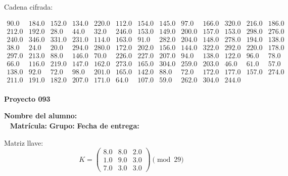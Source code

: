 \documentclass[12pt]{article}
\begin{document}
Cadena cifrada:
\begin{center}
$\begin{array}{lllllllllllll}
90.0 & 184.0 & 152.0 & 134.0 & 220.0 & 112.0 & 154.0 & 145.0 & 97.0 & 166.0 & 320.0 & 216.0 & 186.0\\
212.0 & 192.0 & 28.0 & 44.0 & 32.0 & 246.0 & 153.0 & 149.0 & 200.0 & 157.0 & 153.0 & 298.0 & 276.0\\
240.0 & 346.0 & 331.0 & 231.0 & 114.0 & 163.0 & 91.0 & 282.0 & 204.0 & 148.0 & 278.0 & 194.0 & 138.0\\
38.0 & 24.0 & 20.0 & 294.0 & 280.0 & 172.0 & 202.0 & 156.0 & 144.0 & 322.0 & 292.0 & 220.0 & 178.0\\
297.0 & 213.0 & 88.0 & 146.0 & 70.0 & 226.0 & 227.0 & 207.0 & 94.0 & 138.0 & 122.0 & 96.0 & 78.0\\
66.0 & 116.0 & 219.0 & 147.0 & 162.0 & 273.0 & 165.0 & 304.0 & 259.0 & 203.0 & 46.0 & 61.0 & 57.0\\
138.0 & 92.0 & 72.0 & 98.0 & 201.0 & 165.0 & 142.0 & 88.0 & 72.0 & 172.0 & 177.0 & 157.0 & 274.0\\
211.0 & 191.0 & 182.0 & 207.0 & 171.0 & 64.0 & 107.0 & 59.0 & 262.0 & 304.0 & 244.0\\
\end{array}$
\end{center}

\newpage


\textbf{Proyecto 093}

\textbf{Nombre del alumno:} \underline{\hspace{13cm}}\\\
\vspace{1cm}
\textbf{Matrícula:} \underline{\hspace{4cm}} \hspace{1cm}
\textbf{Grupo:} \underline{\hspace{2cm}}
\textbf{Fecha de entrega:} \underline{\hspace{2cm}}

\medskip

Matriz llave:
\[
K = \begin{pmatrix}
8.0 & 8.0 & 2.0\\
1.0 & 9.0 & 3.0\\
7.0 & 3.0 & 3.0
\end{pmatrix} \pmod{29}
\]
\end{document}
